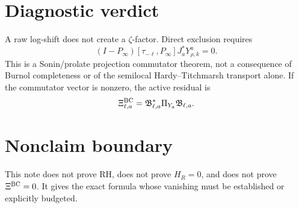 \documentclass[11pt]{article}
\begin{document}
\section{Diagnostic verdict}
A raw log-shift does not create a \(\zeta\)-factor. Direct exclusion requires
\[
(I-P_\infty)[\tau_{-\ell},P_\infty]J_a^*Y^a_{\rho,k}=0.
\]
This is a Sonin/prolate projection commutator theorem, not a consequence of Burnol completeness or of the semilocal Hardy--Titchmarsh transport alone. If the commutator vector is nonzero, the active residual is
\[
\Xi^{\rm BC}_{\ell,a}
=\mathfrak B_{\ell,a}^*\Pi_{Y_a}\mathfrak B_{\ell,a}.
\]

\section{Nonclaim boundary}
This note does not prove RH, does not prove \(H_R=0\), and does not prove \(\Xi^{\rm BC}=0\). It gives the exact formula whose vanishing must be established or explicitly budgeted.
\end{document}
